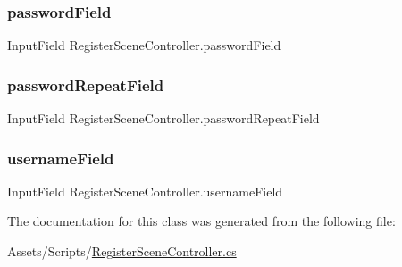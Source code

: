 \subsubsection{\texorpdfstring{password\+Field}{passwordField}}
{\footnotesize\ttfamily Input\+Field Register\+Scene\+Controller.\+password\+Field}

\mbox{\label{classRegisterSceneController_a69afc78a2738889c4b0761405d630a1e}} 
\subsubsection{\texorpdfstring{password\+Repeat\+Field}{passwordRepeatField}}
{\footnotesize\ttfamily Input\+Field Register\+Scene\+Controller.\+password\+Repeat\+Field}

\mbox{\label{classRegisterSceneController_ac27f7ab56f00b3713652c2d136e85421}} 
\subsubsection{\texorpdfstring{username\+Field}{usernameField}}
{\footnotesize\ttfamily Input\+Field Register\+Scene\+Controller.\+username\+Field}



The documentation for this class was generated from the following file\+:\begin{DoxyCompactItemize}
\item 
Assets/\+Scripts/\hyperlink{RegisterSceneController_8cs}{Register\+Scene\+Controller.\+cs}\end{DoxyCompactItemize}
